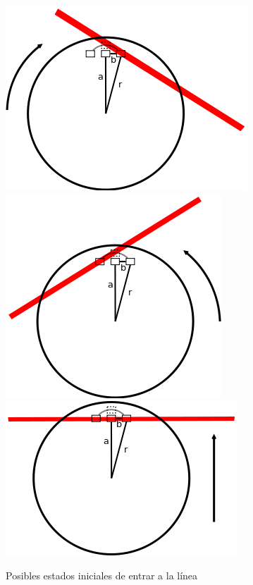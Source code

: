 \begin{figure}[htp]
\begin{center}
\includegraphics[scale=0.4]{comportamientos/floorSensorsLine.png}
\includegraphics[scale=0.4]{comportamientos/floorSensorsLine1.png}
\includegraphics[scale=0.4]{comportamientos/floorSensorsLine2.png}
\caption{Posibles estados iniciales de entrar a la l\'inea}
\label{fig:floorSensorsStates}
\end{center}
\end{figure}

